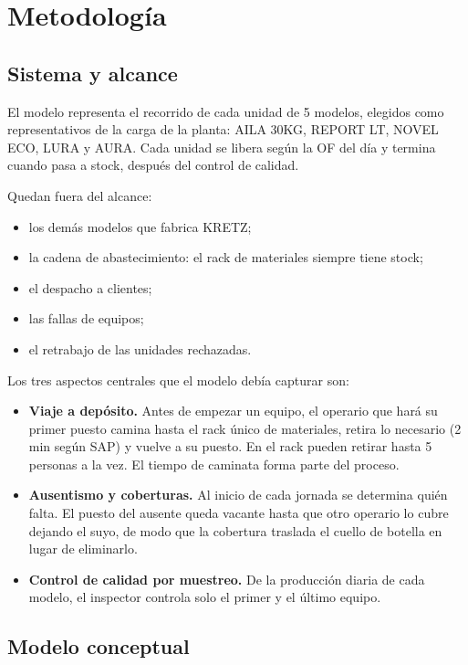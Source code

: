 \documentclass[11pt,a4paper]{article}
\begin{document}
\section{Metodología}

\subsection{Sistema y alcance}

El modelo representa el recorrido de cada unidad de 5 modelos, elegidos como representativos de la carga de la planta: AILA 30KG, REPORT LT, NOVEL ECO, LURA y AURA. Cada unidad se libera según la OF del día y termina cuando pasa a stock, después del control de calidad.

Quedan fuera del alcance:

\begin{itemize}
\item los demás modelos que fabrica KRETZ;
\item la cadena de abastecimiento: el rack de materiales siempre tiene stock;
\item el despacho a clientes;
\item las fallas de equipos;
\item el retrabajo de las unidades rechazadas.
\end{itemize}

Los tres aspectos centrales que el modelo debía capturar son:

\begin{itemize}
\item \textbf{Viaje a depósito.} Antes de empezar un equipo, el operario que hará su primer puesto camina hasta el rack único de materiales, retira lo necesario (2 min según SAP) y vuelve a su puesto. En el rack pueden retirar hasta 5 personas a la vez. El tiempo de caminata forma parte del proceso.
\item \textbf{Ausentismo y coberturas.} Al inicio de cada jornada se determina quién falta. El puesto del ausente queda vacante hasta que otro operario lo cubre dejando el suyo, de modo que la cobertura traslada el cuello de botella en lugar de eliminarlo.
\item \textbf{Control de calidad por muestreo.} De la producción diaria de cada modelo, el inspector controla solo el primer y el último equipo.
\end{itemize}

\subsection{Modelo conceptual}
\end{document}
